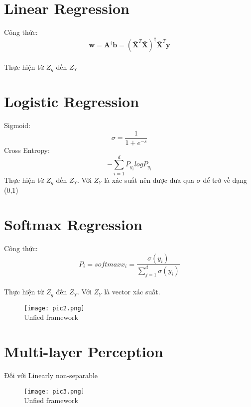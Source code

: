 \documentclass{article}
\begin{document}
\section{Linear Regression}
    Công thức:
    $$\mathbf{w} = \mathbf{A}^{\dagger}\mathbf{b} = (\mathbf{\bar{X}}^T\mathbf{\bar{X}})^{\dagger} \mathbf{\bar{X}}^T\mathbf{y}$$\\
    Thực hiện từ $Z_g$ đến $Z_Y$
\section{Logistic Regression}
    Sigmoid:\\
    $$\sigma = \frac{1}{1+e^{-s}}$$
    Cross Entropy:
    $$-\sum_{i=1} ^{d} P_y_i logP_y_i $$
    Thực hiện từ $Z_g$ đến $Z_Y$. Với $Z_Y$ là xác suất nên được đưa qua $\sigma$ để trở về dạng (0,1)
\section{Softmax Regression}
    Công thức: \
$$P_i = softmax x_i = \frac{\sigma (y_i)}{\sum_{j=1}^{d}\sigma(y_i)}$$\\
    Thực hiện từ $Z_g$ đến $Z_Y$. Với $Z_Y$ là vector xác suất.\\
\begin{figure}[h!]
\centering\texttt{[image: pic2.png]}
\\Unfied framework\\
\end{figure}

\section{Multi-layer Perception}

    Đối với Linearly non-separable\\
\begin{figure}[h!]
\centering\texttt{[image: pic3.png]}
\\Unfied framework\\
\end{figure}
\end{document}
